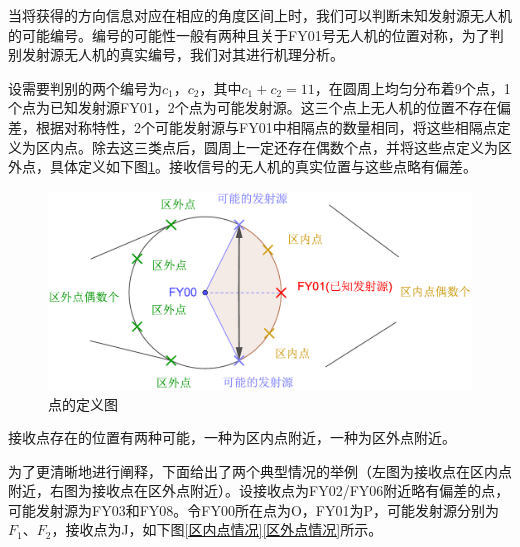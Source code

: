 \documentclass{ctexart}
\begin{document}
当将获得的方向信息对应在相应的角度区间上时，我们可以判断未知发射源无人机的可能编号。编号的可能性一般有两种且关于FY01号无人机的位置对称，为了判别发射源无人机的真实编号，我们对其进行机理分析。

设需要判别的两个编号为$c_1$，$c_2$，其中$c_1+c_2=11$，在圆周上均匀分布着9个点，1个点为已知发射源FY01，2个点为可能发射源。这三个点上无人机的位置不存在偏差，根据对称特性，2个可能发射源与FY01中相隔点的数量相同，将这些相隔点定义为区内点。除去这三类点后，圆周上一定还存在偶数个点，并将这些点定义为区外点，具体定义如下图\ref{点的定义图}。接收信号的无人机的真实位置与这些点略有偏差。

\begin{figure}[H]
  \centering
  \includegraphics[width=0.55\linewidth]{pic/regional_points.eps}
  \caption{点的定义图}
  \label{点的定义图}
  \end{figure}


接收点存在的位置有两种可能，一种为区内点附近，一种为区外点附近。

为了更清晰地进行阐释，下面给出了两个典型情况的举例（左图为接收点在区内点附近，右图为接收点在区外点附近）。设接收点为FY02/FY06附近略有偏差的点，可能发射源为FY03和FY08。令FY00所在点为O，FY01为P，可能发射源分别为$F_1$、$F_2$，接收点为J，如下图\ref{区内点情况}\ref{区外点情况}所示。
\end{document}

